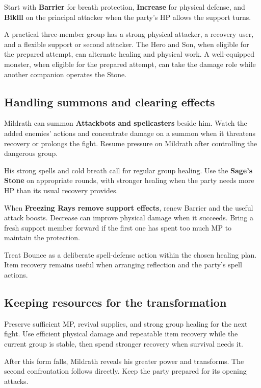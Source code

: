 Start with \textbf{Barrier} for breath protection,
\textbf{Increase} for physical defense, and
\textbf{Bikill} on the principal attacker when the
party's HP allows the support turns.

A practical three-member group has a strong physical
attacker, a recovery user, and a flexible support or
second attacker. The Hero and Son, when eligible for the
prepared attempt, can alternate healing and physical work.
A well-equipped monster, when eligible
for the prepared attempt, can take the
damage role while another companion operates the Stone.

\subsection*{Handling summons and clearing effects}

Mildrath can summon \textbf{Attackbots and spellcasters}
beside him. Watch the added enemies' actions and concentrate
damage on a summon when it threatens recovery or prolongs
the fight. Resume pressure on Mildrath after controlling
the dangerous group.

His strong spells and cold breath call for regular group
healing. Use the \textbf{Sage's Stone} on appropriate
rounds, with stronger healing when the party needs more
HP than its usual recovery provides.

When \textbf{Freezing Rays remove support effects},
renew Barrier and the useful attack boosts. Decrease can
improve physical damage when it succeeds. Bring a fresh
support member forward if the first one has spent too
much MP to maintain the protection.

Treat Bounce as a deliberate spell-defense action within
the chosen healing plan. Item recovery remains useful
when arranging reflection and the party's spell actions.

\subsection*{Keeping resources for the transformation}

Preserve sufficient MP, revival supplies, and strong group
healing for the next fight. Use efficient physical damage
and repeatable item recovery while the current group is
stable, then spend stronger recovery when survival needs it.

After this form falls, Mildrath reveals his greater power
and transforms. The second confrontation follows directly.
Keep the party prepared for its opening attacks.

